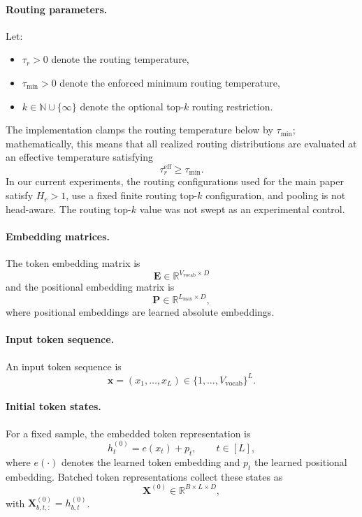 \documentclass{article}
\theoremstyle{plain}
\theoremstyle{definition}
\theoremstyle{remark}
\begin{document}
\paragraph{Routing parameters.}
Let:
\begin{itemize}
    \item $\tau_r > 0$ denote the routing temperature,
    \item $\tau_{\min} > 0$ denote the enforced minimum routing temperature,
    \item $k \in \mathbb{N} \cup \{\infty\}$ denote the optional top-$k$ routing restriction.
\end{itemize}
The implementation clamps the routing temperature below by $\tau_{\min}$; mathematically, this means that all realized routing distributions are evaluated at an effective temperature satisfying
\begin{equation}
\label{eq:tau-clamp}
\tau_r^{\mathrm{eff}} \ge \tau_{\min}.
\end{equation}
In our current experiments, the routing configurations used for the main paper satisfy $H_r>1$, use a fixed finite routing top-$k$ configuration, and pooling is not head-aware. The routing top-$k$ value was not swept as an experimental control.

\paragraph{Embedding matrices.}
The token embedding matrix is
\begin{equation}
\label{eq:token-embedding}
\mathbf{E} \in \mathbb{R}^{V_{\mathrm{vocab}} \times D}
\end{equation}
and the positional embedding matrix is
\begin{equation}
\label{eq:pos-embedding}
\mathbf{P} \in \mathbb{R}^{L_{\max} \times D},
\end{equation}
where positional embeddings are learned absolute embeddings.

\paragraph{Input token sequence.}
An input token sequence is
\begin{equation}
\label{eq:input-sequence}
\mathbf{x}=(x_1,\dots,x_L)\in\{1,\dots,V_{\mathrm{vocab}}\}^L.
\end{equation}

\paragraph{Initial token states.}
For a fixed sample, the embedded token representation is
\begin{equation}
\label{eq:sample-token-state}
h_t^{(0)}=e(x_t)+p_t,
\qquad t\in[L],
\end{equation}
where $e(\cdot)$ denotes the learned token embedding and $p_t$ the learned positional embedding. Batched token representations collect these states as
\begin{equation}
\label{eq:token-states}
\mathbf{X}^{(0)}\in\mathbb{R}^{B\times L\times D},
\end{equation}
with $\mathbf X^{(0)}_{b,t,:}=h_{b,t}^{(0)}$.
\end{document}
